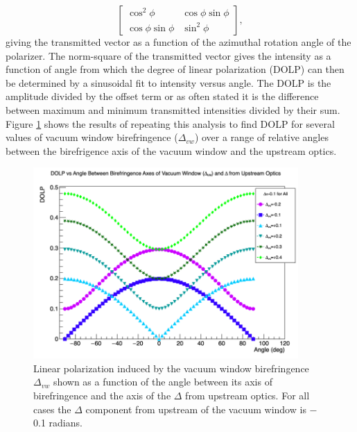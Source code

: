 \documentclass[12pt]{article}
\begin{document}
\begin{equation*}
\begin{bmatrix}
\cos^2\phi     & \cos\phi\sin\phi\\
\cos\phi\sin\phi & \sin^2\phi
\end{bmatrix},
\end{equation*}
giving the transmitted vector as a function of the azimuthal rotation angle of the polarizer. The norm-square of the transmitted vector gives the intensity as a function of angle from which the degree of linear polarization (DOLP) can then be determined by a sinusoidal fit to intensity versus angle. The DOLP is the amplitude divided by the offset term or as often stated it is the difference between maximum and minimum transmitted intensities divided by their sum.
Figure \ref{fig:pita_vs_angle} shows the results of repeating this analysis to find DOLP for several values of vacuum window birefringence ($\Delta_{vw}$) over a range of relative angles between the birefrigence axis of the vacuum window and the upstream optics.
\begin{figure}
\includegraphics[width=0.9\textwidth]{Vacuum_window_delta_vs_angle.png}
\caption{\label{fig:pita_vs_angle}Linear polarization induced by the vacuum window birefringence $\Delta_{vw}$ shown as a function of the angle between its axis of birefringence and the axis of the $\Delta$ from upstream optics. For all cases the $\Delta$ component from upstream of the vacuum window is $-$0.1 radians.}
\end{figure}
\end{document}

